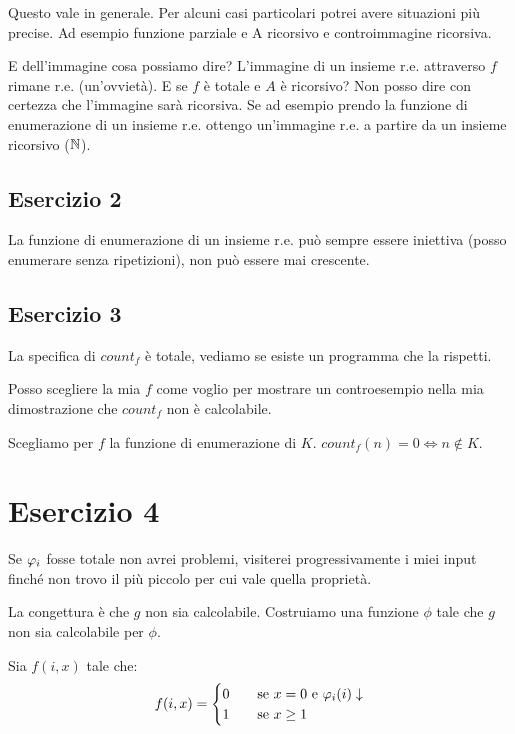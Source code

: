 
Questo vale in generale. Per alcuni casi particolari potrei avere situazioni più precise. Ad
esempio funzione parziale e A ricorsivo e controimmagine ricorsiva.

E dell'immagine cosa possiamo dire? L'immagine di un insieme r.e. attraverso $f$ rimane r.e.
(un'ovvietà). E se $f$ è totale e $A$ è ricorsivo? Non posso dire con certezza che l'immagine
sarà ricorsiva. Se ad esempio prendo la funzione di enumerazione di un insieme r.e. ottengo
un'immagine r.e. a partire da un insieme ricorsivo ($\mathbb{N}$).

\subsection{Esercizio 2}

La funzione di enumerazione di un insieme r.e. può sempre essere iniettiva (\ie posso enumerare
senza ripetizioni), non può essere mai crescente.

\subsection{Esercizio 3}

La specifica di $\textit{count}_{f}$ è totale, vediamo se esiste un programma che la rispetti.

Posso scegliere la mia $f$ come voglio per mostrare un controesempio nella mia dimostrazione che
$\textit{count}_{f}$ non è calcolabile.

Scegliamo per $f$ la funzione di enumerazione di $K$. $count_{f}(n) = 0 \iff n \notin K$.

\section{Esercizio 4}

Se $\varphi_{i}$ fosse totale non avrei problemi, visiterei progressivamente i miei input finché non trovo
il più piccolo per cui vale quella proprietà.

La congettura è che $g$ non sia calcolabile. Costruiamo una funzione $\phi$ tale che $g$ non sia
calcolabile per $\phi$.

Sia $f(i,x)$ tale che:
\begin{equation*}
    f(i,x) =
    \begin{cases}
        0 \quad &\text{se $x = 0$ e $\varphi_{i}(i) \downarrow$}\\
        1 \quad &\text{se $x \geq 1$}
    \end{cases}
\end{equation*}


